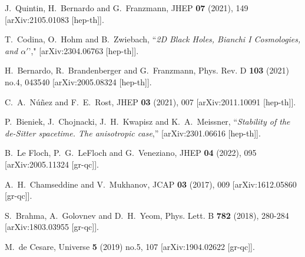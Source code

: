 \documentclass[a4paper,11pt]{article}
\begin{document}
\begin{thebibliography}{99}
J.~Quintin, H.~Bernardo and G.~Franzmann,
JHEP \textbf{07} (2021), 149
[arXiv:2105.01083 [hep-th]].

T.~Codina, O.~Hohm and B.~Zwiebach,
``{\it 2D Black Holes, Bianchi I Cosmologies, and $\alpha'$}',"
[arXiv:2304.06763 [hep-th]]. 

H.~Bernardo, R.~Brandenberger and G.~Franzmann,
Phys. Rev. D \textbf{103} (2021) no.4, 043540
[arXiv:2005.08324 [hep-th]].

C.~A.~N\'u\~nez and F.~E.~Rost,
JHEP \textbf{03} (2021), 007
[arXiv:2011.10091 [hep-th]].

P.~Bieniek, J.~Chojnacki, J.~H.~Kwapisz and K.~A.~Meissner,
``{\it Stability of the de-Sitter spacetime. The anisotropic case},''
[arXiv:2301.06616 [hep-th]].

B.~Le Floch, P.~G.~LeFloch and G.~Veneziano,
JHEP \textbf{04} (2022), 095
[arXiv:2005.11324 [gr-qc]].

A.~H.~Chamseddine and V.~Mukhanov,
JCAP \textbf{03} (2017), 009
[arXiv:1612.05860 [gr-qc]].

S.~Brahma, A.~Golovnev and D.~H.~Yeom,
Phys. Lett. B \textbf{782} (2018), 280-284
[arXiv:1803.03955 [gr-qc]].

M.~de Cesare,
Universe \textbf{5} (2019) no.5, 107
[arXiv:1904.02622 [gr-qc]].






%
%




\end{thebibliography}
\end{document}
